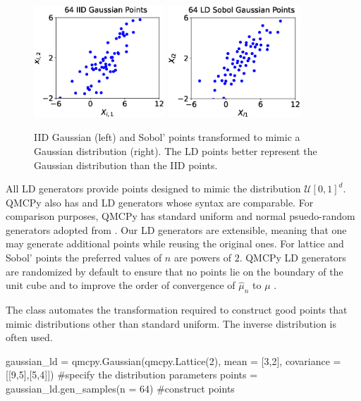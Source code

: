 \documentclass[11pt]{NSFamsart}
\newcommand{\calu}{{\mathcal{U}}}
\newcommand{\hmu}{\hat{\mu}}
\begin{document}
\begin{figure}
	\centering
	\includegraphics[height = 4.2cm]{ProgramsImages/Gauss_IID.eps}
	\includegraphics[height = 4.2cm]{ProgramsImages/Gauss_Sobol.eps}
	\caption{IID Gaussian (left) and Sobol'  points transformed to mimic a Gaussian distribution (right).  The LD points better represent the Gaussian distribution than the IID points. \label{fig:ld_Gauss}}
\end{figure}

All LD generators provide points designed to mimic the distribution $\calu[0,1]^d$.  QMCPy also has  \cite{DicPil10a} and  \cite{Hal60} LD generators whose syntax are comparable.
For comparison purposes, QMCPy  has standard uniform and normal psuedo-random generators adopted from .  Our LD generators are extensible, meaning that one may generate additional points while reusing the original ones.  For lattice and Sobol' points the preferred values of $n$ are powers of $2$.  QMCPy LD generators are randomized by default to ensure that no points lie on the boundary of the unit cube and to improve the order of convergence of $\hmu_n$ to $\mu$ \cite{Owe97}.

The  class automates the transformation required to construct good points that mimic distributions other than standard uniform.  The  inverse  distribution is often used.
\begin{pythoncode}
gaussian_ld = qmcpy.Gaussian(qmcpy.Lattice(2), mean = [3,2], covariance = [[9,5],[5,4]])  #specify the distribution parameters
points = gaussian_ld.gen_samples(n = 64)  #construct points
\end{pythoncode}
\end{document}

